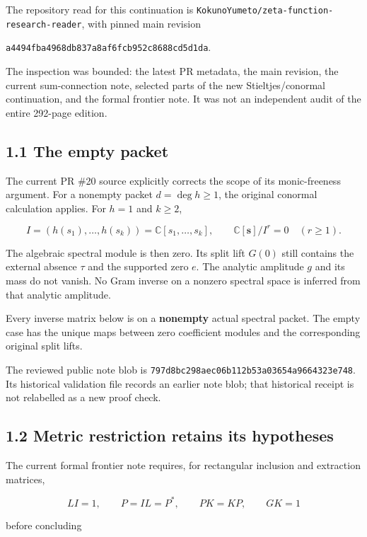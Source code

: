 \documentclass[
  11pt,
]{article}
\begin{document}
The repository read for this continuation is
\texttt{KokunoYumeto/zeta-function-research-reader}, with pinned main
revision

\texttt{a4494fba4968db837a8af6fcb952c8688cd5d1da}.

The inspection was bounded: the latest PR metadata, the main revision,
the current sum-connection note, selected parts of the new
Stieltjes/conormal continuation, and the formal frontier note. It was
not an independent audit of the entire 292-page edition.

\subsection{1.1 The empty packet}\label{the-empty-packet}

The current PR \#20 source explicitly corrects the scope of its
monic-freeness argument. For a nonempty packet \(d=\deg h\geq1\), the
original conormal calculation applies. For \(h=1\) and \(k\geq2\),

\[
I=(h(s_1),\ldots,h(s_k))=\mathbb C[s_1,\ldots,s_k],
\qquad
\mathbb C[\mathbf s]/I^r=0\quad(r\geq1).
\]

The algebraic spectral module is then zero. Its split lift \(G(0)\)
still contains the external absence \(\tau\) and the supported zero
\(e\). The analytic amplitude \(g\) and its mass do not vanish. No Gram
inverse on a nonzero spectral space is inferred from that analytic
amplitude.

Every inverse matrix below is on a \textbf{nonempty} actual spectral
packet. The empty case has the unique maps between zero coefficient
modules and the corresponding original split lifts.

The reviewed public note blob is
\texttt{797d8bc298aec06b112b53a03654a9664323e748}. Its historical
validation file records an earlier note blob; that historical receipt is
not relabelled as a new proof check.

\subsection{1.2 Metric restriction retains its
hypotheses}\label{metric-restriction-retains-its-hypotheses}

The current formal frontier note requires, for rectangular inclusion and
extraction matrices,

\[
LI=1,\qquad P=IL=P^*,\qquad PK=KP,\qquad GK=1
\]

before concluding
\end{document}
